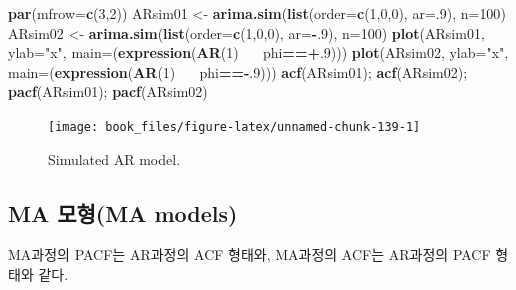 \documentclass[b5paper,]{scrbook}
\makeatletter
\newenvironment{Shaded}{\begin{snugshade}}{\end{snugshade}}
\newcommand{\KeywordTok}[1]{\textcolor[rgb]{0.13,0.29,0.53}{\textbf{#1}}}
\newcommand{\DataTypeTok}[1]{\textcolor[rgb]{0.13,0.29,0.53}{#1}}
\newcommand{\DecValTok}[1]{\textcolor[rgb]{0.00,0.00,0.81}{#1}}
\newcommand{\StringTok}[1]{\textcolor[rgb]{0.31,0.60,0.02}{#1}}
\newcommand{\OperatorTok}[1]{\textcolor[rgb]{0.81,0.36,0.00}{\textbf{#1}}}
\newcommand{\ErrorTok}[1]{\textcolor[rgb]{0.64,0.00,0.00}{\textbf{#1}}}
\newcommand{\NormalTok}[1]{#1}
\theoremstyle{plain}
\theoremstyle{definition}
\numberwithin{equation}{section}
\newenvironment{kframe}{%
\medskip{}
\setlength{\fboxsep}{.8em}
 \def\at@end@of@kframe{}%
 \ifinner\ifhmode%
  \def\at@end@of@kframe{\end{minipage}}%
  \begin{minipage}{\columnwidth}%
 \fi\fi%
 \def\FrameCommand##1{\hskip\@totalleftmargin \hskip-\fboxsep
 \colorbox{shadecolor}{##1}\hskip-\fboxsep
     \hskip-\linewidth \hskip-\@totalleftmargin \hskip\columnwidth}%
 \MakeFramed {\advance\hsize-\width
   \@totalleftmargin\z@ \linewidth\hsize
   \@setminipage}}%
 {\par\unskip\endMakeFramed%
 \at@end@of@kframe}
\renewenvironment{Shaded}{\begin{kframe}}{\end{kframe}}
\makeatother
\begin{document}
\begin{Shaded}
\begin{Highlighting}[]
\KeywordTok{par}\NormalTok{(}\DataTypeTok{mfrow=}\KeywordTok{c}\NormalTok{(}\DecValTok{3}\NormalTok{,}\DecValTok{2}\NormalTok{))}
\NormalTok{ARsim01 <-}\StringTok{ }\KeywordTok{arima.sim}\NormalTok{(}\KeywordTok{list}\NormalTok{(}\DataTypeTok{order=}\KeywordTok{c}\NormalTok{(}\DecValTok{1}\NormalTok{,}\DecValTok{0}\NormalTok{,}\DecValTok{0}\NormalTok{), }\DataTypeTok{ar=}\NormalTok{.}\DecValTok{9}\NormalTok{), }\DataTypeTok{n=}\DecValTok{100}\NormalTok{)}
\NormalTok{ARsim02 <-}\StringTok{ }\KeywordTok{arima.sim}\NormalTok{(}\KeywordTok{list}\NormalTok{(}\DataTypeTok{order=}\KeywordTok{c}\NormalTok{(}\DecValTok{1}\NormalTok{,}\DecValTok{0}\NormalTok{,}\DecValTok{0}\NormalTok{), }\DataTypeTok{ar=}\OperatorTok{-}\NormalTok{.}\DecValTok{9}\NormalTok{), }\DataTypeTok{n=}\DecValTok{100}\NormalTok{)}
\KeywordTok{plot}\NormalTok{(ARsim01, }\DataTypeTok{ylab=}\StringTok{"x"}\NormalTok{, }\DataTypeTok{main=}\NormalTok{(}\KeywordTok{expression}\NormalTok{(}\KeywordTok{AR}\NormalTok{(}\DecValTok{1}\NormalTok{)}\OperatorTok{~}\ErrorTok{~~}\NormalTok{phi}\OperatorTok{==+}\NormalTok{.}\DecValTok{9}\NormalTok{)))}
\KeywordTok{plot}\NormalTok{(ARsim02, }\DataTypeTok{ylab=}\StringTok{"x"}\NormalTok{, }\DataTypeTok{main=}\NormalTok{(}\KeywordTok{expression}\NormalTok{(}\KeywordTok{AR}\NormalTok{(}\DecValTok{1}\NormalTok{)}\OperatorTok{~}\ErrorTok{~~}\NormalTok{phi}\OperatorTok{==-}\NormalTok{.}\DecValTok{9}\NormalTok{)))}
\KeywordTok{acf}\NormalTok{(ARsim01); }\KeywordTok{acf}\NormalTok{(ARsim02); }\KeywordTok{pacf}\NormalTok{(ARsim01); }\KeywordTok{pacf}\NormalTok{(ARsim02)}
\end{Highlighting}
\end{Shaded}

\begin{figure}

{\centering \texttt{[image: book\_files/figure-latex/unnamed-chunk-139-1]} 

}

\caption{Simulated AR model.}\label{fig:unnamed-chunk-139}
\end{figure}

\subsection{MA 모형(MA models)}\label{ma-ma-models}

MA과정의 PACF는 AR과정의 ACF 형태와, MA과정의 ACF는 AR과정의 PACF 형태와
같다.
\end{document}
